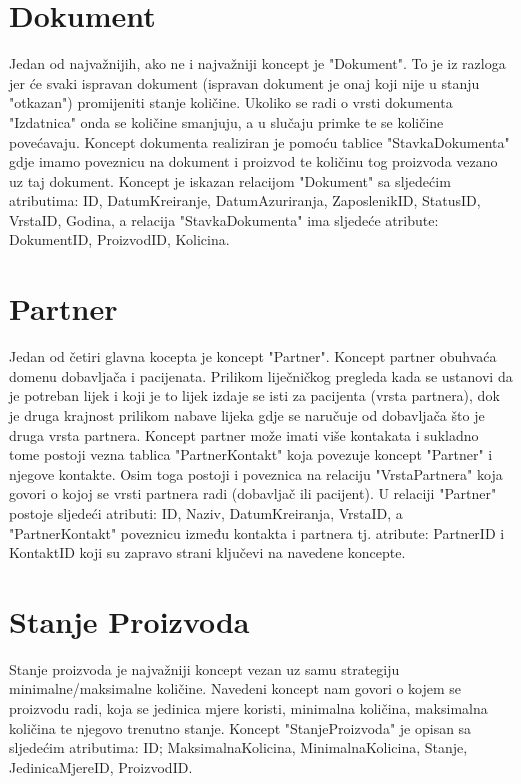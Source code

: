\documentclass[a4paper,12pt]{foi}
\begin{document}
\section{Dokument}

Jedan od najvažnijih, ako ne i najvažniji koncept je "Dokument". To je iz razloga jer će svaki ispravan dokument (ispravan dokument je onaj koji nije u stanju "otkazan") promijeniti stanje količine. Ukoliko se radi o vrsti dokumenta "Izdatnica" onda se količine smanjuju, a u slučaju primke te se količine povećavaju. Koncept dokumenta realiziran je pomoću tablice "Stavka\textunderscore Dokumenta" gdje imamo poveznicu na dokument i proizvod te količinu tog proizvoda vezano uz taj dokument. Koncept je iskazan relacijom "Dokument" sa sljedećim atributima:  ID, DatumKreiranje, DatumAzuriranja, ZaposlenikID, StatusID, VrstaID, Godina, a relacija "Stavka\textunderscore Dokumenta" ima sljedeće atribute: DokumentID, ProizvodID, Kolicina.

\section{Partner}

Jedan od četiri glavna kocepta je koncept "Partner". Koncept partner obuhvaća domenu dobavljača i pacijenata. Prilikom liječničkog pregleda kada se ustanovi da je potreban lijek i koji je to lijek izdaje se isti za pacijenta (vrsta partnera), dok je druga krajnost prilikom nabave lijeka gdje se naručuje od dobavljača što je druga vrsta partnera. Koncept partner može imati više kontakata i sukladno tome postoji vezna tablica "Partner\textunderscore Kontakt" koja povezuje koncept "Partner" i njegove kontakte. Osim toga postoji i poveznica na relaciju "Vrsta\textunderscore Partnera" koja govori o kojoj se vrsti partnera radi (dobavljač ili pacijent). U relaciji "Partner" postoje sljedeći atributi: ID, Naziv, DatumKreiranja, VrstaID, a "Partner\textunderscore Kontakt" poveznicu između kontakta i partnera tj. atribute: PartnerID i KontaktID koji su zapravo strani ključevi na navedene koncepte.

\section{Stanje Proizvoda}

Stanje proizvoda je najvažniji koncept vezan uz samu strategiju minimalne/maksimalne količine. Navedeni koncept nam govori o kojem se proizvodu radi, koja se jedinica mjere koristi, minimalna količina, maksimalna količina te njegovo trenutno stanje. Koncept "Stanje\textunderscore Proizvoda" je opisan sa sljedećim atributima: ID; MaksimalnaKolicina, MinimalnaKolicina, Stanje, JedinicaMjereID, ProizvodID.
\end{document}

